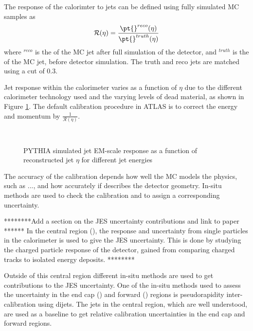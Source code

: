 The response of the calorimter to jets can be defined using fully simulated MC samples as
\begin{equation}
\mathcal{R(\eta)} = \frac{\pt{}^{reco}(\eta)}{\pt{}^{truth}(\eta)}
\label{JetPerf:MCJetResp}
\end{equation}
where \pt{}$^{reco}$ is the \pt{} of the MC jet after full simulation of the detector, and  \pt{}$^{truth}$ is the \pt{} of the MC jet, before detector simulation. 
The truth and reco jets are matched using a \dr{} cut of 0.3.

Jet response within the calorimeter varies as a function of $\eta$ due to the different calorimeter technology used and the varying levels of dead material, as shown in Figure \ref{JetPerf:MCResp}.
The default calibration procedure in ATLAS is to correct the energy and momentum by $\frac{1}{\mathcal{R(\eta)}}$.

\begin{figure}
\centering
\mbox{
              {}
                              }
\caption[]{ PYTHIA simulated jet EM-scale response as a function of reconstructed jet $\eta$ for different jet energies \cite{ref:EtaInter2010}
\label{JetPerf:MCResp}}
\end{figure}

The accuracy of the calibration depends how well the MC models the physics, such as ..., and how accurately if describes the detector geometry. 
In-situ methods are used to check the calibration and to assign a corresponding uncertainty.


********Add a section on the JES uncertainty contributions and link to paper ******
In the central region (), the response and uncertainty from single particles in the calorimeter is used to give the JES uncertainty.  
This is done by  studying the charged particle response of the detector, gained from comparing charged tracks to isolated energy deposits.
********


Outside of this central region different in-situ methods are used to get contributions to the JES uncertainty.
One of the in-situ methods used to assess the uncertainty in the end cap () and forward () regions is pseudorapidity inter-calibration using dijets.
The jets in the central region, which are well understood, are used as a baseline to get relative calibration uncertainties in the end cap and forward regions. 

